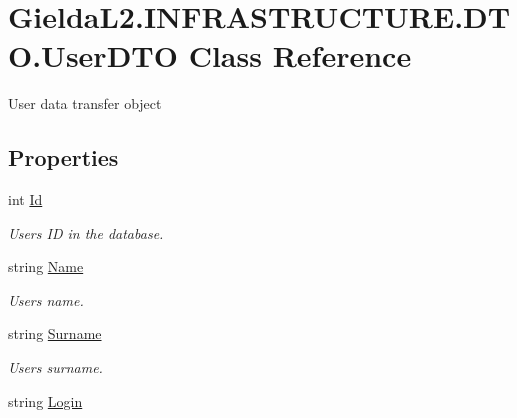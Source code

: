 \hypertarget{class_gielda_l2_1_1_i_n_f_r_a_s_t_r_u_c_t_u_r_e_1_1_d_t_o_1_1_user_d_t_o}{}\section{Gielda\+L2.\+I\+N\+F\+R\+A\+S\+T\+R\+U\+C\+T\+U\+R\+E.\+D\+T\+O.\+User\+D\+TO Class Reference}
\label{class_gielda_l2_1_1_i_n_f_r_a_s_t_r_u_c_t_u_r_e_1_1_d_t_o_1_1_user_d_t_o}


User data transfer object  


\subsection*{Properties}
\begin{DoxyCompactItemize}
\item 
int \mbox{\hyperlink{class_gielda_l2_1_1_i_n_f_r_a_s_t_r_u_c_t_u_r_e_1_1_d_t_o_1_1_user_d_t_o_a79dd047f46085ddf9dbcb4de1f70107b}{Id}}
\begin{DoxyCompactList}\small\item\em User\textquotesingle{}s ID in the database. \end{DoxyCompactList}\item 
string \mbox{\hyperlink{class_gielda_l2_1_1_i_n_f_r_a_s_t_r_u_c_t_u_r_e_1_1_d_t_o_1_1_user_d_t_o_a8b2f8d057e01f7341df06efb69f1f937}{Name}}
\begin{DoxyCompactList}\small\item\em User\textquotesingle{}s name. \end{DoxyCompactList}\item 
string \mbox{\hyperlink{class_gielda_l2_1_1_i_n_f_r_a_s_t_r_u_c_t_u_r_e_1_1_d_t_o_1_1_user_d_t_o_aec4236d725361ff8f72fe3faeabc9836}{Surname}}
\begin{DoxyCompactList}\small\item\em User\textquotesingle{}s surname. \end{DoxyCompactList}\item 
string \mbox{\hyperlink{class_gielda_l2_1_1_i_n_f_r_a_s_t_r_u_c_t_u_r_e_1_1_d_t_o_1_1_user_d_t_o_a53e84db0387b852b5a8bf94c0c7872ad}{Login}}

\end{DoxyCompactItemize}
